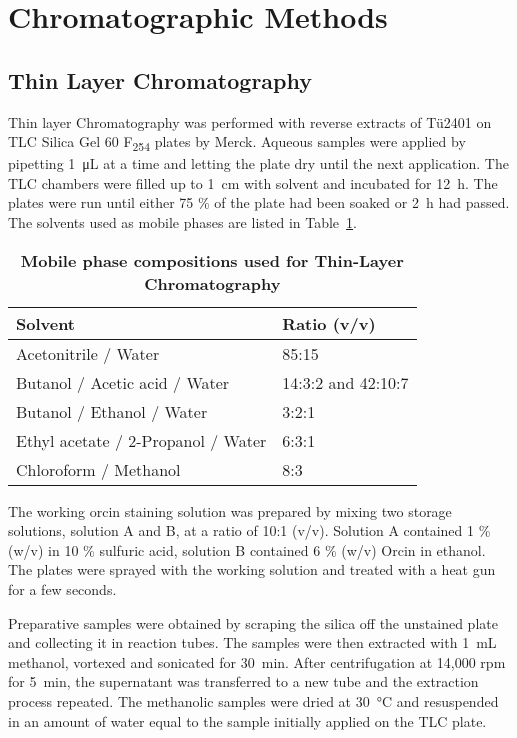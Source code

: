 \clearpage

\section{Chromatographic Methods} %
\label{sec:chromatographic_methods}

	\subsection{Thin Layer Chromatography} %
	\label{sub:thin_layer_chromatography}
	Thin layer Chromatography was performed with reverse extracts of T\"u2401 on TLC Silica Gel 60 F\textsubscript{254} plates by Merck.
	Aqueous samples were applied by pipetting \SI{1}{\micro\liter} at a time and letting the plate dry until the next application. The TLC chambers were filled up to \SI{1}{\centi\meter} with solvent and incubated for \SI{12}{\hour}. The plates were run until either 75 \% of the plate had been soaked or \SI{2}{\hour} had passed. The solvents used as mobile phases are listed in Table~\ref{tab:tlc_solvents}.

	\begin{table}[htbp]
		\caption{\textbf{Mobile phase compositions used for Thin-Layer Chromatography}}
		\label{tab:tlc_solvents}
		\centering
		\begin{tabularx}{\textwidth}{XX}
			\toprule
			\textbf{Solvent}			& \textbf{Ratio (v/v)}	\\
			\midrule
			Acetonitrile / Water				& 85:15		\\
			Butanol / Acetic acid / Water		& 14:3:2 and 42:10:7	\\
			Butanol / Ethanol / Water			& 3:2:1		\\
			Ethyl acetate / 2-Propanol / Water	& 6:3:1		\\
			Chloroform / Methanol				& 8:3		\\
			\bottomrule
		\end{tabularx}
	\end{table}

	The working orcin staining solution was prepared by mixing two storage solutions, solution A and B, at a ratio of 10:1 (v/v). Solution A contained 1 \% (w/v)  in 10 \% sulfuric acid, solution B contained 6 \% (w/v) Orcin in ethanol. The plates were sprayed with the working solution and treated with a heat gun for a few seconds.

	Preparative samples were obtained by scraping the silica off the unstained plate and collecting it in reaction tubes. The samples were then extracted with \SI{1}{\milli\liter} methanol, vortexed and sonicated for \SI{30}{\minute}. After centrifugation at 14,000 rpm for \SI{5}{\minute}, the supernatant was transferred to a new tube and the extraction process repeated. The methanolic samples were dried at \SI{30}{\celsius} and resuspended in an amount of water equal to the sample initially applied on the TLC plate.

